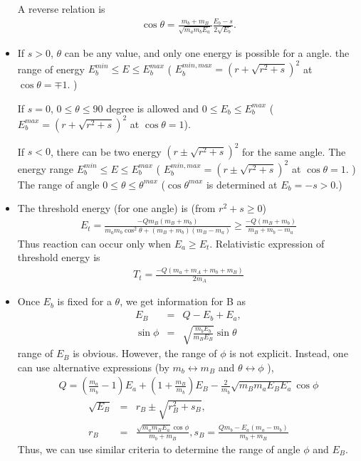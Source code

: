 \documentclass[10pt]{book}
\newcommand{\bea}{\begin{eqnarray}}
\newcommand{\eea}{\end{eqnarray}}
\newcommand{\no}{\nonumber \\}
\begin{document}
\begin{itemize}
	A reverse relation is 
	\bea 
	\cos\theta = \frac{m_b+m_B}{\sqrt{m_a m_b E_a}} \frac{E_b-s}{2\sqrt{E_b}}.
	\eea 

    \item 
	If $s > 0$, $\theta$ can be any value, and only one energy is possible for a angle. 
	the range of energy $E_b^{min}\leq E\leq E_b^{max}$ ( $E_b^{min,max}=(r+\sqrt{r^2+s})^2$ at $\cos\theta=\mp 1$. )  
    
    If $s=0$, $0\leq \theta\leq 90$ degree is allowed and $0\leq E_b\leq E_b^{max}$
    ( $E_b^{max}=(r+\sqrt{r^2+s})^2$ at $\cos\theta=1$). 
    
    If $s< 0$, there can be two energy $(r\pm \sqrt{r^2+s})^2  $ for the same angle.
    The energy range $E_b^{min}\leq E \leq E_b^{max}$ 
    ( $E_b^{min,max}=(r\pm \sqrt{r^2+s})^2$ at $\cos\theta= 1$. )
    The range of angle $0\leq \theta\leq \theta^{max}$ 
    ($\cos\theta^{max}$ is determined at $E_b = -s>0$.) 
    
    \item 
	The threshold energy (for one angle) is (from $r^2+s\geq 0$)
	\bea 
	E_t = \frac{-Q m_B(m_B+m_b)}{m_a m_b \cos^2\theta+(m_B+m_b)(m_B-m_a)} 
	      \geq \frac{-Q(m_B+m_b)}{m_B+m_b-m_a} 
	\eea 
	Thus reaction can occur only when $E_a\geq E_t$. 
	Relativistic expression of threshold energy is
	\bea 
	T_{t} =\frac{-Q(m_a+m_A+m_b+m_B)}{2 m_A}
	\eea 
	\item Once $E_b$ is fixed for a $\theta$, we get information for B as
	  \bea 
	  E_B &=& Q-E_b+E_a ,\no 
	  \sin\phi &=& \sqrt{\frac{m_b E_b}{m_B E_B}}\sin\theta 
	  \eea 
	  range of $E_B$ is obvious. However, the range of $\phi$ is not explicit. 
	Instead, one can use alternative expressions (by $m_b\leftrightarrow m_B$
	and $\theta \leftrightarrow \phi$	),
	\bea 
	Q = (\frac{m_a}{m_b}-1)E_a+(1+\frac{m_B}{m_b})E_B-\frac{2}{m_b}\sqrt{m_B m_a E_B E_a}\cos\phi 
	\eea  
	\bea 
	\sqrt{E_B} &=& r_B \pm \sqrt{r_B^2 +s_B}, \no 
	r_B &=& \frac{\sqrt{m_a m_B E_a}\cos\phi}{m_b+m_B}, 
	s_B = \frac{Q m_b-E_a(m_a-m_b)}{m_b+m_B}
	\eea  
	Thus, we can use similar criteria to determine the range of angle $\phi$ and $E_B$. 
	

\end{itemize}
\end{document}
